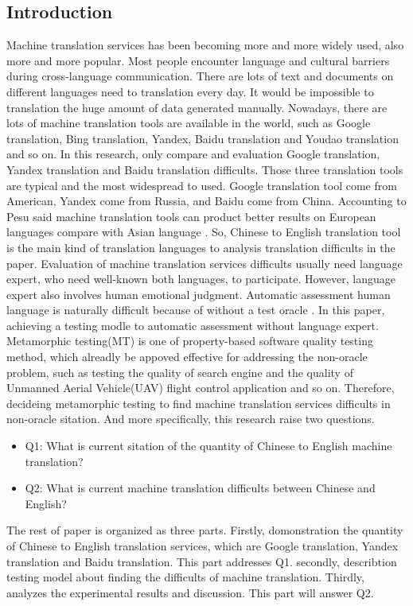 \documentclass[conference]{IEEEtran}
\begin{document}
\begin{CJK*}{UTF8}{gbsn}
\section{Introduction}
Machine translation services has been becoming more and more widely used, also
more and more popular. Most people encounter language and cultural barriers
during cross-language communication. There are lots of text and documents on different languages need
to translation every day. It would be impossible to translation the huge amount
of data generated manually. Nowadays, there are lots of machine translation
tools are available in the world, such as Google translation, Bing translation,
Yandex, Baidu translation and Youdao translation and so on. In this research,
only compare and evaluation Google translation, Yandex translation and Baidu
translation difficults. Those three translation tools are typical and the most
widespread to used. Google translation tool come from American, Yandex come from
Russia, and Baidu come from China. Accounting to Pesu said machine translation
tools can product better results on European languages compare with Asian
language \cite{pesu2018monte}. So, Chinese to English translation tool is the main
kind of translation languages to analysis translation difficults in the paper.
Evaluation of machine translation services difficults usually need language
expert, who need well-known both languages, to participate. However, language
expert also involves human emotional judgment. Automatic assessment human
language is naturally difficult because of without a test oracle \cite{zhou2016metamorphic}.
In this paper, achieving a testing modle to automatic assessment
without language expert. Metamorphic testing(MT) is one of property-based
software quality testing method, which alreadly be appoved effective for
addressing the non-oracle problem, such as testing the quality of search engine
and the quality of Unmanned Aerial Vehicle(UAV) flight control application and so on.
Therefore, decideing metamorphic testing to find machine translation services
difficults in non-oracle sitation.
And more specifically, this research raise two questions.
\begin{itemize}
  \item Q1: What is current sitation of the quantity of Chinese to English
    machine translation?
  \item Q2: What is current machine translation difficults between Chinese and English?
\end{itemize}

The rest of paper is organized as three parts. Firstly, domonstration the
quantity of Chinese to English translation services, which are Google
translation, Yandex translation and Baidu translation. This part addresses Q1.
secondly, describtion testing model about finding the difficults of machine
translation.
Thirdly, analyzes the experimental results and discussion. This part will
answer Q2.


\end{CJK*}
\end{document}
